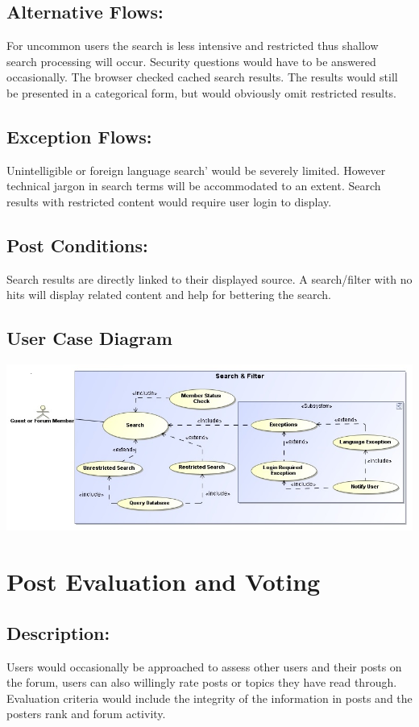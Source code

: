 \documentclass[12pt, oneside]{book}
\begin{document}
\subsection{Alternative Flows:} 
For uncommon users the search is less intensive and restricted thus shallow search processing will occur. Security questions would have to be answered occasionally. The browser checked cached search results. The results would still be presented in a categorical form, but would obviously omit restricted results. 
\subsection{Exception Flows:} 
Unintelligible or foreign language search’ would be severely limited. However technical jargon in search terms will be accommodated to an extent. Search results with restricted content would require user login to display.
\subsection{Post Conditions:} 
Search results are directly linked to their displayed source. A search/filter with no hits will display related content and help for bettering the search.
\subsection{User Case Diagram}
\begin{center}
\includegraphics[scale=0.5]{SearchAndFilter.png}
\end{center}
\section{Post Evaluation and Voting}
\subsection{Description:} 
Users would occasionally be approached to assess other users and their posts on the forum, users can also willingly rate posts or topics they have read through. Evaluation criteria would include the integrity of the information in posts and the posters rank and forum activity.
\end{document}
